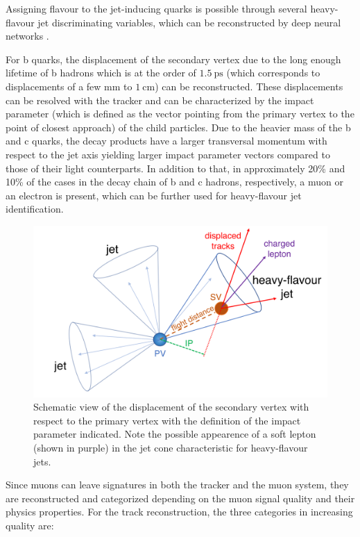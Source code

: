 
Assigning flavour to the jet-inducing quarks is possible through several heavy-flavour jet discriminating variables, which can be reconstructed by deep neural networks \cite{Sirunyan_2018}.

For b quarks, the displacement of the secondary vertex due to the long enough lifetime of b hadrons which is at the order of $\SI{1.5}{\pico\second}$ (which corresponds to displacements of a few mm to $\SI{1}{\centi\meter}$) can be reconstructed. These displacements can be resolved with the tracker and can be characterized by the impact parameter (which is defined as the vector pointing from the primary vertex to the point of closest approach) of the child particles. Due to the heavier mass of the b and c quarks, the decay products have a larger transversal momentum with respect to the jet axis yielding larger impact parameter vectors compared to those of their light counterparts. In addition to that, in approximately 20\% and 10\% of the cases in the decay chain of b and c hadrons, respectively, a muon or an electron is present, which can be further used for heavy-flavour jet identification.

\begin{figure}[h!]
	\centering
	\includegraphics[width=0.6\linewidth]{figures/experiment/pvsv}
	\caption{Schematic view of the displacement of the secondary vertex with respect to the primary vertex with the definition of the impact parameter indicated. Note the possible appearence of a soft lepton (shown in purple) in the jet cone characteristic for heavy-flavour jets.}
	\label{fig:pvsv}
\end{figure}


Since muons can leave signatures in both the tracker and the muon system, they are reconstructed and categorized depending on the muon signal quality and their physics properties. For the track reconstruction, the three categories in increasing quality are: \cite{Collaboration_2010}


